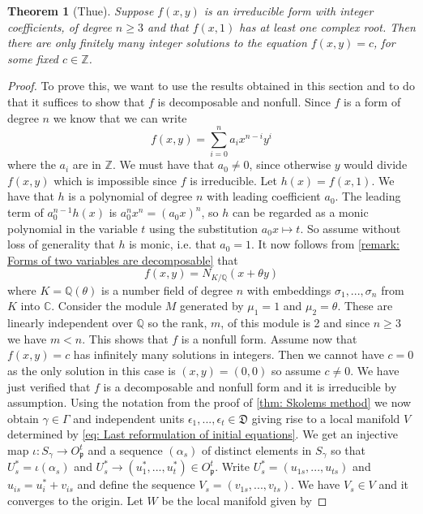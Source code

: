 \documentclass{article}
\newtheorem{theorem}{Theorem}[section]
\newcommand{\mfrak}[1]{\mathfrak{#1}}
\newcommand{\mbb}[1]{\mathbb{#1}}
\begin{document}

\begin{theorem}[Thue]\label{thm: Thues theorem}
    Suppose $f(x,y)$ is an irreducible form with integer coefficients, of degree $n \geq 3$ and that $f(x,1)$ has at least one complex root. Then there are only finitely many integer solutions to the equation $f(x,y) = c$, for some fixed $c \in \mbb{Z}$.
\end{theorem}
\begin{proof}
    To prove this, we want to use the results obtained in this section and to do that it suffices to show that $f$ is decomposable and nonfull. Since $f$ is a form of degree $n$ we know that we can write
    $$f(x,y) = \sum_{i = 0}^n a_i x^{n-i} y^{i}$$
    where the $a_i$ are in $\mbb Z$. We must have that $a_0 \neq 0$, since otherwise $y$ would divide $f(x,y)$ which is impossible since $f$ is irreducible. Let $h(x) = f(x,1)$. We have that $h$ is a polynomial of degree $n$ with leading coefficient $a_0$. The leading term of $a_0^{n-1} h(x)$ is $a_0^nx^n = (a_0 x)^n$, so $h$ can be regarded as a monic polynomial in the variable $t$ using the substitution $a_0 x \mapsto t$. So assume without loss of generality that $h$ is monic, i.e. that $a_0 = 1$. It now follows from \cref{remark: Forms of two variables are decomposable} that  
    \begin{equation}\label{eq: f(x,y) is a norm form}
        f(x, y) = N_{K / \mbb Q}(x + \theta y)
    \end{equation}
    where $K = \mbb Q(\theta)$ is a number field of degree $n$ with embeddings $\sigma_1, ..., \sigma_n$ from $K$ into $\mbb C$. Consider the module $M$ generated by $\mu_1 = 1$ and $\mu_2 = \theta$. These are linearly independent over $\mbb Q$ so the rank, $m$, of this module is 2 and since $n \geq 3$ we have $m < n$. This shows that $f$ is a nonfull form. Assume now that $f(x,y) = c$ has infinitely many solutions in integers. Then we cannot have $c = 0$ as the only solution in this case is $(x,y) = (0,0)$ so assume $c \neq 0$. We have just verified that $f$ is a decomposable and nonfull form and it is irreducible by assumption. Using the notation from the proof of \cref{thm: Skolems method} we now obtain $\gamma \in \Gamma$ and independent units $\epsilon_1, ..., \epsilon_t \in \mfrak D$ giving rise to a local manifold $V$ determined by \cref{eq: Last reformulation of initial equations}. We get an injective map $\iota : S_\gamma \to O_\mfrak p^t$ and a sequence $(\alpha_s)$ of distinct elements in $S_\gamma$ so that $U^*_s = \iota(\alpha_s)$ and $U^*_s \to (u_1^*, ..., u_t^*) \in O_\mfrak p^t$. Write $U^*_s = (u_{1s}, ..., u_{ts})$ and $u_{is} = u_i^* + v_{is}$ and define the sequence $V_s = (v_{1s}, ..., v_{ts})$. We have $V_s \in V$ and it converges to the origin. Let $W$ be the local manifold given by 

\end{proof}
\end{document}
